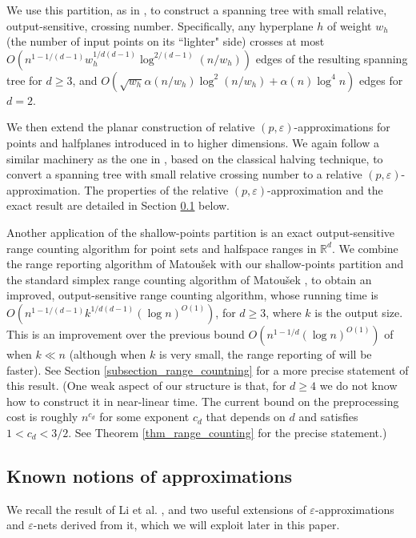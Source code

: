 \documentclass[11pt]{article}
\def\reals{\mathbb R}
\def\peps{(p,\varepsilon)}
\def\eps{\varepsilon}
\begin{document}
We use this partition, as in \cite{hs11}, to construct a spanning tree with small relative, output-sensitive, crossing number.
Specifically, any hyperplane $h$ of weight $w_{h}$ (the number of input points on its ``lighter" side) crosses at most $O(n^{1-1/(d-1)}
w_{h}^{1/d(d-1)}\log^{2/(d-1)}(n/w_{h}))$ edges of the resulting spanning tree for $d \geq 3$, and $O(\sqrt{w_{h}} \alpha(n/w_{h}) \log^{2}(n/w_{h}) +
\alpha(n)\log^{4}n)$ edges for $d = 2$.

We then extend the planar construction of relative $\peps$-approximations for points and halfplanes introduced in \cite{hs11} to higher dimensions. We again
follow a similar machinery as the one in \cite{hs11}, based on the classical halving technique, to convert a spanning tree with small relative crossing
number to a relative $\peps$-approximation. The properties of the relative $\peps$-approximation and the exact result are detailed in Section
\ref{subsection_approximations} below.

Another application of the shallow-points partition is an exact output-sensitive range counting algorithm for point sets and halfspace ranges in
$\reals^{d}$. We combine the range reporting algorithm of Matou\v{s}ek \cite{mat92b} with our shallow-points partition and the standard simplex range
counting algorithm of Matou\v{s}ek \cite{mat92a}, to obtain an improved, output-sensitive range counting algorithm, whose running time is $O(n^{1-1/(d-1)}
k^{1/d(d-1)} (\log n)^{O(1)})$, for $d \geq 3$, where $k$ is the output size. This is an improvement over the previous bound $O(n^{1-1/d} (\log n)^{O(1)})$
of \cite{mat92a} when $k \ll n$ (although when $k$ is very small, the range reporting of \cite{mat92b} will be faster). See Section
\ref{subsection_range_countning} for a more precise statement of this result. (One weak aspect of our structure is that, for $d \geq 4$ we do not know how
to construct it in near-linear time. The current bound on the preprocessing cost is roughly $n^{c_{d}}$ for some exponent $c_{d}$ that depends on $d$ and
satisfies $1 < c_{d} < 3/2$. See Theorem \ref{thm_range_counting} for the precise statement.)

\subsection{Known notions of approximations} \label{subsection_approximations}
We recall the result of Li et al. \cite{lls01}, and two useful extensions of $\eps$-approximations and $\eps$-nets derived from it, which we will exploit later in this paper.
\end{document}
